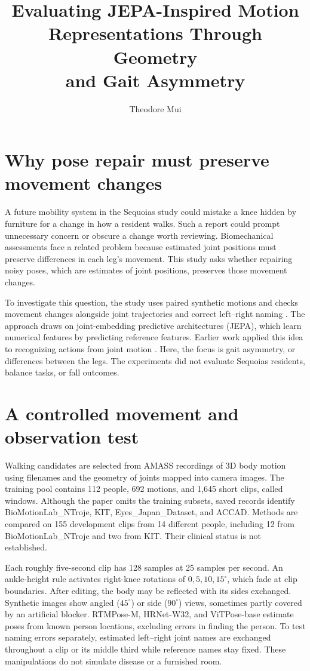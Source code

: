 \documentclass{article}
\title{Evaluating JEPA-Inspired Motion\\
Representations Through Geometry\\
and Gait Asymmetry}
\author{Theodore Mui}
\newcommand{\dg}{^{\circ}}
\begin{document}
\maketitle
{}


\section{Why pose repair must preserve movement changes}
A future mobility system in the Sequoias study could mistake a knee hidden by furniture for a change in how a resident walks. Such a report could prompt unnecessary concern or obscure a change worth reviewing. Biomechanical assessments face a related problem because estimated joint positions must preserve differences in each leg's movement. This study asks whether repairing noisy poses, which are estimates of joint positions, preserves those movement changes.

To investigate this question, the study uses paired synthetic motions and checks movement changes alongside joint trajectories and correct left--right naming \citep{study2026v08}. The approach draws on joint-embedding predictive architectures (JEPA), which learn numerical features by predicting reference features. Earlier work applied this idea to recognizing actions from joint motion \citep{abdelfattah2024sjepa}. Here, the focus is gait asymmetry, or differences between the legs. The experiments did not evaluate Sequoias residents, balance tasks, or fall outcomes.

\section{A controlled movement and observation test}
Walking candidates are selected from AMASS recordings of 3D body motion \citep{mahmood2019amass} using filenames and the geometry of joints mapped into camera images. The training pool contains 112 people, 692 motions, and 1,645 short clips, called windows. Although the paper omits the training subsets, saved records identify BioMotionLab\_NTroje, KIT, Eyes\_Japan\_Dataset, and ACCAD. Methods are compared on 155 development clips from 14 different people, including 12 from BioMotionLab\_NTroje and two from KIT. Their clinical status is not established.

Each roughly five-second clip has 128 samples at 25 samples per second. An ankle-height rule activates right-knee rotations of $0,5,10,15\dg$, which fade at clip boundaries. After editing, the body may be reflected with its sides exchanged. Synthetic images show angled ($45\dg$) or side ($90\dg$) views, sometimes partly covered by an artificial blocker. RTMPose-M, HRNet-W32, and ViTPose-base estimate poses from known person locations, excluding errors in finding the person. To test naming errors separately, estimated left--right joint names are exchanged throughout a clip or its middle third while reference names stay fixed. These manipulations do not simulate disease or a furnished room.
\end{document}
